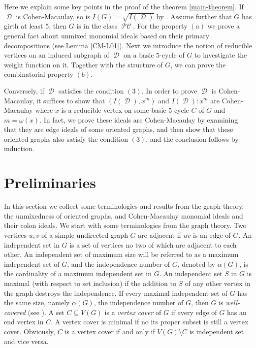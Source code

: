 \documentclass[12pt, amscd]{amsart}
\theoremstyle{definition}
\DeclareMathOperator{\pc}{\mathcal{PC}}
\DeclareMathOperator{\D}{\mathcal{D}}
\newcommand{\0}{\bold{0}}
\begin{document}
\medskip

Here we explain some key points in the proof of the theorem \ref{main-theorem}. If $\D$ is Cohen-Macaulay,  so is $I(G) = \sqrt{I(\D)}$ by \cite[Theorem 2.6]{HTT}. Assume further that $G$ has girth at least $5$, then $G$ is in the class $\pc$. For the property $(a)$ we prove a general fact about unmixed monomial ideals based on their primary decompositions (see Lemma \ref{CM-L01}). Next we introduce the notion of reducible vertices on an induced subgraph of $\D$ on a basic $5$-cycle of $G$ to investigate the weight function on it. Together with the structure of $G$, we can prove the combinatorial property $(b)$.

Conversely, if $\D$ satisfies the condition $(3)$. In order to prove $\D$ is Cohen-Macaulay, it suffices to show that $(I(\D),x^m)$ and $I(\D)\colon x^m$ are Cohen-Macaulay where $x$ is a 
reducible vertex on some basic $5$-cycle $C$ of $G$  and $m=\omega(x)$. In fact, we  prove these ideals are Cohen-Macaulay by examining that they are edge ideals of some oriented graphs, and then show that these oriented graphs also satisfy the condition $(3)$, and the conclusion follows by induction.



\section{Preliminaries}

In this section we collect some terminologies and results from the graph theory, the unmixedness of oriented graphs, and Cohen-Macaulay monomial ideals and their colon ideals. We start with some terminologies from the graph theory. Two vertices $u, v$ of a simple undirected graph $G$ are adjacent if $uv$ is an edge of $G$. An independent set in $G$ is a set of vertices no two of which are adjacent to each other. An independent set of maximum size will be referred to as a maximum independent set of $G$, and the independence number of $G$, denoted by $\alpha(G)$, is the cardinality of a maximum independent set in $G$. An independent set $S$ in $G$ is maximal (with respect to set inclusion) if the addition to $S$ of any other vertex in the graph destroys the independence.  If every maximal independent set of $G$ has the same size, namely $\alpha(G)$, the independence number of $G$,  then $G$ is {\it well-covered} (see \cite{P}).  A set $C\subseteq V(G)$ is a {\it vertex cover} of $G$ if every edge of $G$ has an end vertex in $C$.  A vertex cover is minimal if no its proper subset is still a vertex cover. Obviously,  $C$ is a vertex cover if and only if $V(G)\setminus C$ is independent set and vice versa.  
\end{document}
